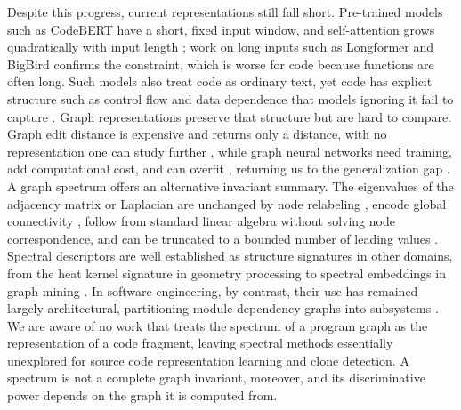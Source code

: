 \documentclass[final,5p,times,twocolumn]{elsarticle}
\theoremstyle{plain}
\begin{document}
Despite this progress, current representations still fall short. Pre-trained models such as CodeBERT have a short, fixed input window, and self-attention grows quadratically with input length \cite{feng2020codebert,vaswani2017attention}; work on long inputs such as Longformer \cite{beltagy2020longformer} and BigBird \cite{zaheer2020bigbird} confirms the constraint, which is worse for code because functions are often long. Such models also treat code as ordinary text, yet code has explicit structure such as control flow and data dependence \cite{hindle2012naturalness,allamanis2018survey} that models ignoring it fail to capture \cite{chen2021codex,dou2023llmsurvey}. Graph representations preserve that structure but are hard to compare. Graph edit distance is expensive and returns only a distance, with no representation one can study further \cite{komondoor2001slicing}, while graph neural networks need training, add computational cost, and can overfit \cite{kipf2017gcn,xu2019gin}, returning us to the generalization gap \cite{sonnekalb2022generalizability}. {A graph spectrum offers an alternative invariant summary. The eigenvalues of the adjacency matrix or Laplacian are unchanged by node relabeling \cite{chung1997spectral,mohar1991laplacian}, encode global connectivity \cite{fiedler1973algebraic}, follow from standard linear algebra without solving node correspondence, and can be truncated to a bounded number of leading values \cite{defferrard2016cnngraph}. Spectral descriptors are well established as structure signatures in other domains, from the heat kernel signature in geometry processing \cite{sun2009hks,zhang2010spectralmesh} to spectral embeddings in graph mining \cite{belkin2003laplacian,narayanan2017graph2vec}. In software engineering, by contrast, their use has remained largely architectural, partitioning module dependency graphs into subsystems \cite{shokoufandeh2005spectral}. We are aware of no work that treats the spectrum of a program graph as the representation of a code fragment, leaving spectral methods essentially unexplored for source code representation learning and clone detection. A spectrum is not a complete graph invariant, moreover, and its discriminative power depends on the graph it is computed from.}
\end{document}
